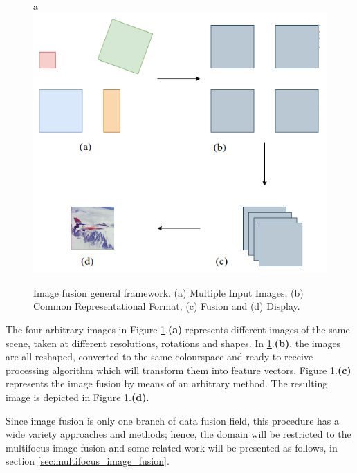 \begin{figure}[H]
	\centering
	\caption{\label{fig:fusion_general_framework}Image fusion general framework. (a) Multiple Input Images, (b) Common Representational Format, (c) Fusion and (d) Display.}
	\begin{center}
a 	    \includegraphics[scale=0.4]{images/fig10.png}
	\end{center}
	\centering
    \fautor
\end{figure}

The four arbitrary images in Figure \ref{fig:fusion_general_framework}.\textbf{(a)} represents different images of the same scene, taken at different resolutions, rotations and shapes. In \ref{fig:fusion_general_framework}.\textbf{(b)}, the images are all reshaped, converted to the same colourspace and ready to receive processing algorithm which will transform them into feature vectors. Figure \ref{fig:fusion_general_framework}.\textbf{(c)} represents the image fusion by means of an arbitrary method. The resulting image is depicted in Figure \ref{fig:fusion_general_framework}.\textbf{(d)}.

Since image fusion is only one branch of data fusion field, this procedure has a wide variety approaches and methods; hence, the domain will be restricted to the multifocus image fusion and some related work will be presented as follows, in section \ref{sec:multifocus_image_fusion}.
